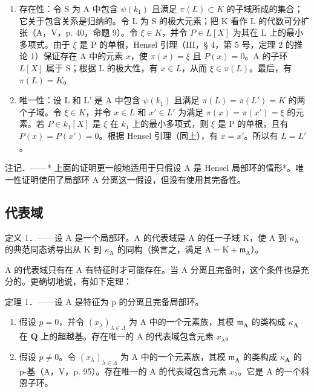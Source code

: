 \begin{enumerate}
\def\labelenumi{\alph{enumi})}
\item
  存在性：令 S 为 A 中包含 \(\psi(k_1)\) 且满足 \(\pi(L) \subset K\) 的子域所成的集合；它关于包含关系是归纳的。令 L 为 S 的极大元素；把 K 看作 L 的代数可分扩张（A，V，p. 40，命题 9）。令 \(\xi \in K\)，并令 \(P \in L[X]\) 为其在 L 上的最小多项式。由于 \(\xi\) 是 P 的单根，Hensel 引理（III，§ 4，第 5 号，定理 2 的推论 1）保证存在 A 中的元素 \(x\)，使 \(\pi(x) = \xi\) 且 \(P(x) = 0\)。A 的子环 \(L[X]\) 属于 S；根据 L 的极大性，有 \(x \in L\)，从而 \(\xi \in \pi(L)\)。最后，有 \(\pi(L) = K\)。
\item
  唯一性：设 L 和 L' 是 A 中包含 \(\psi(k_1)\) 且满足 \(\pi(L) = \pi(L') = K\) 的两个子域。令 \(\xi \in K\)，并令 \(x \in L\) 和 \(x' \in L'\) 为满足 \(\pi(x) = \pi(x') = \xi\) 的元素。若 \(P \in k_1[X]\) 是 \(\xi\) 在 \(k_1\) 上的最小多项式，则 \(\xi\) 是 P 的单根，且有 \(P(x) = P(x') = 0\)。根据 Hensel 引理（同上），有 \(x = x'\)。所以有 \(L = L'\)。
\end{enumerate}

注记．——* 上面的证明更一般地适用于只假设 A 是 Hensel 局部环的情形*。唯一性证明使用了局部环 A 分离这一假设，但没有使用其完备性。

\subsection{代表域}

定义 1．——设 A 是一个局部环。A 的代表域是 A 的任一子域 K，使 A 到 \(\kappa_{\mathrm{A}}\) 的典范同态诱导出从 K 到 \(\kappa_{\mathrm{A}}\) 的同构（换言之，满足 \(\mathrm{A} = \mathrm{K} + \mathfrak{m}_{\mathrm{A}}\)）。

A 的代表域只有在 A 有特征时才可能存在。当 A 分离且完备时，这个条件也是充分的。更确切地说，有如下定理：

定理 1．——设 A 是特征为 p 的分离且完备局部环。

\begin{enumerate}
\def\labelenumi{\alph{enumi})}
\item
  假设 \(p = 0\)，并令 \((x_{\lambda})_{\lambda \in \Lambda}\) 为 A 中的一个元素族，其模 \(\mathfrak{m}_{\mathbf{A}}\) 的类构成 \(\kappa_{\mathbf{A}}\) 在 \(\mathbf{Q}\) 上的超越基。存在唯一的 A 的代表域包含元素 \(x_{\lambda}\)。
\item
  假设 \(p \neq 0\)。令 \((x_{\lambda})_{\lambda \in \Lambda}\) 为 A 中的一个元素族，其模 \(\mathfrak{m}_{\mathbf{A}}\) 的类构成 \(\kappa_{\mathbf{A}}\) 的 p-基（A，V，p. 95）。存在唯一的 A 的代表域包含元素 \(x_{\lambda}\)。它是 A 的一个科恩子环。
\end{enumerate}


